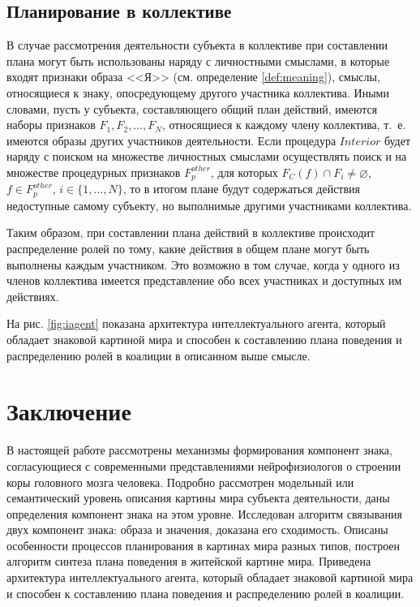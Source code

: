 \documentclass[a4paper, 12pt]{article}
\theoremstyle{break}
\numberwithin{equation}{section}
\begin{document}
	\subsection{Планирование в коллективе} В случае рассмотрения деятельности субъекта в коллективе при составлении плана могут быть использованы наряду с личностными смыслами, в которые входят признаки образа <<Я>> (см. определение \ref{def:meaning}), смыслы, относящиеся к знаку, опосредующему другого участника коллектива. Иными словами, пусть у субъекта, составляющего общий план действий, имеются наборы признаков $F_1,F_2,\dots,F_N$, относящиеся к каждому члену коллектива, т.~е. имеются образы других участников деятельности. Если процедура $Interior$ будет наряду с поиском на множестве личностных смыслами осуществлять поиск и на множестве процедурных признаков $F_p^{other}$, для которых $F_C(f)\cap F_i\not = \varnothing$, $f\in F_p^{other}$, $i\in\{1,\dots,N\}$, то в итогом плане будут содержаться действия недоступные самому субъекту, но выполнимые другими участниками коллектива.
	
	Таким образом, при составлении плана действий в коллективе происходит распределение ролей по тому, какие действия в общем плане могут быть выполнены каждым участником. Это возможно в том случае, когда у одного из членов коллектива имеется представление обо всех участниках и доступных им действиях.
	
	На рис. \ref{fig:iagent} показана архитектура интеллектуального агента, который обладает знаковой картиной мира и способен к составлению плана поведения и распределению ролей в коалиции в описанном выше смысле.

	\section*{Заключение} В настоящей работе рассмотрены механизмы формирования компонент знака, согласующиеся с современными представлениями нейрофизиологов о строении коры головного мозга человека. Подробно рассмотрен модельный или семантический уровень описания картины мира субъекта деятельности, даны определения компонент знака на этом уровне. Исследован алгоритм связывания двух компонент знака: образа и значения, доказана его сходимость. Описаны особенности процессов планирования в картинах мира разных типов, построен алгоритм синтеза плана поведения в житейской картине мира. Приведена архитектура интеллектуального агента, который обладает знаковой картиной мира и способен к составлению плана поведения и распределению ролей в коалиции.
\end{document}
